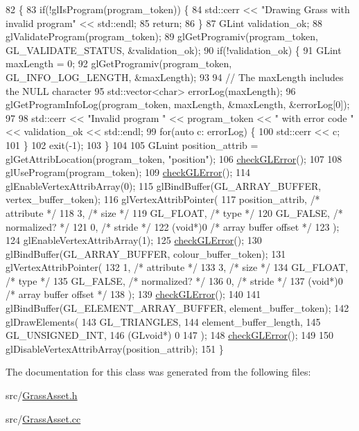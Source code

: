 \begin{DoxyCode}
82                                           \{
83   \textcolor{keywordflow}{if}(!glIsProgram(program\_token)) \{
84     std::cerr << \textcolor{stringliteral}{"Drawing Grass with invalid program"} << std::endl;
85     \textcolor{keywordflow}{return};
86   \}
87   GLint validation\_ok;
88   glValidateProgram(program\_token);
89   glGetProgramiv(program\_token, GL\_VALIDATE\_STATUS, &validation\_ok);
90   \textcolor{keywordflow}{if}(!validation\_ok) \{
91     GLint maxLength = 0;
92     glGetProgramiv(program\_token, GL\_INFO\_LOG\_LENGTH, &maxLength);
93 
94     \textcolor{comment}{// The maxLength includes the NULL character}
95     std::vector<char> errorLog(maxLength);
96     glGetProgramInfoLog(program\_token, maxLength, &maxLength, &errorLog[0]);
97 
98     std::cerr << \textcolor{stringliteral}{"Invalid program "} << program\_token << \textcolor{stringliteral}{" with error code "} << validation\_ok << std::endl;
99     \textcolor{keywordflow}{for}(\textcolor{keyword}{auto} c: errorLog) \{
100       std::cerr << c;
101     \}
102     exit(-1);
103   \}
104 
105   GLuint position\_attrib = glGetAttribLocation(program\_token, \textcolor{stringliteral}{"position"});
106   \hyperlink{GrassAsset_8cc_a75f201b0e53e68726854997957322b8d}{checkGLError}();
107 
108   glUseProgram(program\_token);
109   \hyperlink{GrassAsset_8cc_a75f201b0e53e68726854997957322b8d}{checkGLError}();
114   glEnableVertexAttribArray(0);
115   glBindBuffer(GL\_ARRAY\_BUFFER, vertex\_buffer\_token);
116   glVertexAttribPointer(
117     position\_attrib,        \textcolor{comment}{/* attribute */}
118     3,        \textcolor{comment}{/* size */}
119     GL\_FLOAT,   \textcolor{comment}{/* type */}
120     GL\_FALSE,   \textcolor{comment}{/* normalized? */}
121     0,        \textcolor{comment}{/* stride */}
122     (\textcolor{keywordtype}{void}*)0    \textcolor{comment}{/* array buffer offset */}
123   );
124   glEnableVertexAttribArray(1);
125   \hyperlink{GrassAsset_8cc_a75f201b0e53e68726854997957322b8d}{checkGLError}();
130   glBindBuffer(GL\_ARRAY\_BUFFER, colour\_buffer\_token);
131   glVertexAttribPointer(
132     1,        \textcolor{comment}{/* attribute */}
133     3,        \textcolor{comment}{/* size */}
134     GL\_FLOAT,   \textcolor{comment}{/* type */}
135     GL\_FALSE,   \textcolor{comment}{/* normalized? */}
136     0,        \textcolor{comment}{/* stride */}
137     (\textcolor{keywordtype}{void}*)0    \textcolor{comment}{/* array buffer offset */}
138   );
139   \hyperlink{GrassAsset_8cc_a75f201b0e53e68726854997957322b8d}{checkGLError}();
140 
141   glBindBuffer(GL\_ELEMENT\_ARRAY\_BUFFER, element\_buffer\_token);
142   glDrawElements(
143     GL\_TRIANGLES,
144     element\_buffer\_length,
145     GL\_UNSIGNED\_INT,
146     (GLvoid*) 0
147   );
148   \hyperlink{GrassAsset_8cc_a75f201b0e53e68726854997957322b8d}{checkGLError}();
149 
150   glDisableVertexAttribArray(position\_attrib);
151 \}
\end{DoxyCode}


The documentation for this class was generated from the following files\+:\begin{DoxyCompactItemize}
\item 
src/\hyperlink{GrassAsset_8h}{Grass\+Asset.\+h}\item 
src/\hyperlink{GrassAsset_8cc}{Grass\+Asset.\+cc}\end{DoxyCompactItemize}
